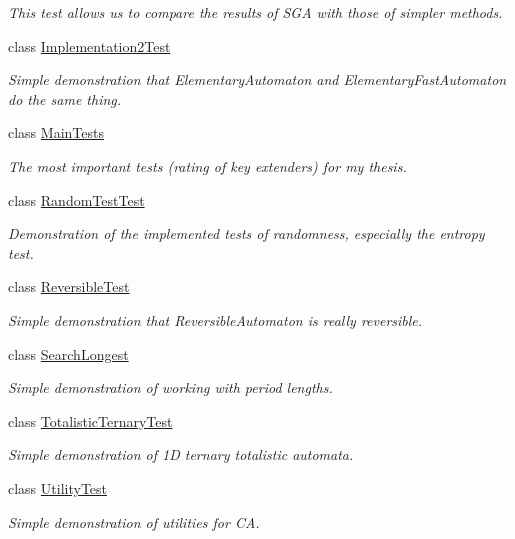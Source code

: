 \begin{DoxyCompactItemize}
\begin{DoxyCompactList}\small\item\em This test allows us to compare the results of S\+G\+A with those of simpler methods. \end{DoxyCompactList}\item 
class \hyperlink{class_testing_1_1_implementation2_test}{Implementation2\+Test}
\begin{DoxyCompactList}\small\item\em Simple demonstration that {\ttfamily Elementary\+Automaton} and {\ttfamily Elementary\+Fast\+Automaton} do the same thing. \end{DoxyCompactList}\item 
class \hyperlink{class_testing_1_1_main_tests}{Main\+Tests}
\begin{DoxyCompactList}\small\item\em The most important tests (rating of key extenders) for my thesis. \end{DoxyCompactList}\item 
class \hyperlink{class_testing_1_1_random_test_test}{Random\+Test\+Test}
\begin{DoxyCompactList}\small\item\em Demonstration of the implemented tests of randomness, especially the entropy test. \end{DoxyCompactList}\item 
class \hyperlink{class_testing_1_1_reversible_test}{Reversible\+Test}
\begin{DoxyCompactList}\small\item\em Simple demonstration that {\ttfamily Reversible\+Automaton} is really reversible. \end{DoxyCompactList}\item 
class \hyperlink{class_testing_1_1_search_longest}{Search\+Longest}
\begin{DoxyCompactList}\small\item\em Simple demonstration of working with period lengths. \end{DoxyCompactList}\item 
class \hyperlink{class_testing_1_1_totalistic_ternary_test}{Totalistic\+Ternary\+Test}
\begin{DoxyCompactList}\small\item\em Simple demonstration of 1\+D ternary totalistic automata. \end{DoxyCompactList}\item 
class \hyperlink{class_testing_1_1_utility_test}{Utility\+Test}
\begin{DoxyCompactList}\small\item\em Simple demonstration of utilities for C\+A. \end{DoxyCompactList}\end{DoxyCompactItemize}
